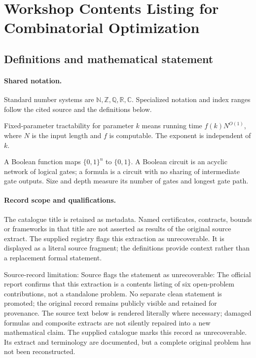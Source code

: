 \documentclass[11pt]{article}
\begin{document}
\section{Workshop Contents Listing for Combinatorial Optimization}\label{statement}

\subsection{Definitions and mathematical statement}

\paragraph{Shared notation.}Standard number systems are $\mathbb N,\mathbb Z,\mathbb Q,\mathbb R,\mathbb C$. Specialized notation and index ranges follow the cited source and the definitions below.


Fixed-parameter tractability for parameter $k$ means running time $f(k)N^{O(1)}$, where $N$ is the input length and $f$ is computable. The exponent is independent of $k$.

A Boolean function maps $\{0,1\}^n$ to $\{0,1\}$. A Boolean circuit is an acyclic network of logical gates; a formula is a circuit with no sharing of intermediate gate outputs. Size and depth measure its number of gates and longest gate path.
\paragraph{Record scope and qualifications.}
The catalogue title is retained as metadata. Named certificates, contracts, bounds or frameworks in that title are not asserted as results of the original source extract.
The supplied registry flags this extraction as unrecoverable. It is displayed as a literal source fragment; the definitions provide context rather than a replacement formal statement.

Source-record limitation: Source flags the statement as unrecoverable: The official report confirms that this extraction is a contents listing of six open-problem contributions, not a standalone problem. No separate clean statement is promoted; the original record remains publicly visible and retained for provenance.
The source text below is rendered literally where necessary; damaged formulas and composite extracts are not silently repaired into a new mathematical claim.
The supplied catalogue marks this record as unrecoverable. Its extract and terminology are documented, but a complete original problem has not been reconstructed.
\end{document}

